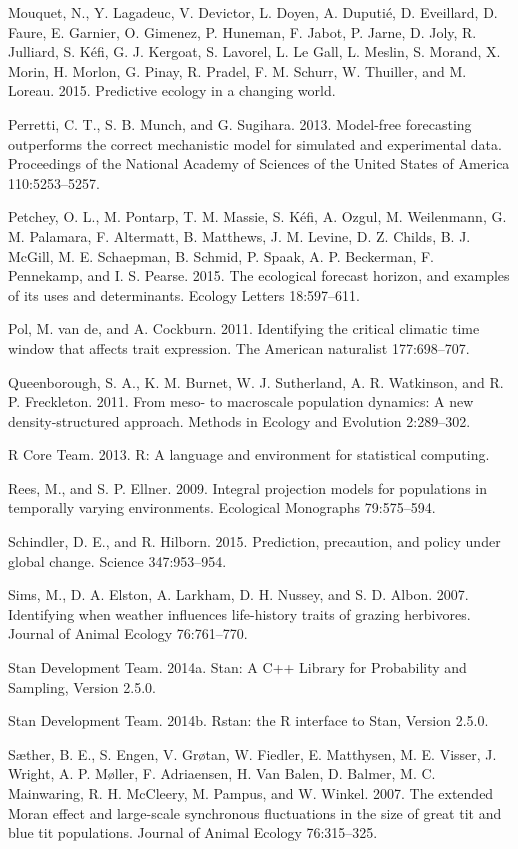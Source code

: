\documentclass[12pt,]{article}
\begin{document}
Mouquet, N., Y. Lagadeuc, V. Devictor, L. Doyen, A. Duputi{é}, D.
Eveillard, D. Faure, E. Garnier, O. Gimenez, P. Huneman, F. Jabot, P.
Jarne, D. Joly, R. Julliard, S. K{é}fi, G. J. Kergoat, S. Lavorel, L.
{Le Gall}, L. Meslin, S. Morand, X. Morin, H. Morlon, G. Pinay, R.
Pradel, F. M. Schurr, W. Thuiller, and M. Loreau. 2015. Predictive
ecology in a changing world.

Perretti, C. T., S. B. Munch, and G. Sugihara. 2013. Model-free
forecasting outperforms the correct mechanistic model for simulated and
experimental data. Proceedings of the National Academy of Sciences of
the United States of America 110:5253--5257.

Petchey, O. L., M. Pontarp, T. M. Massie, S. K{é}fi, A. Ozgul, M.
Weilenmann, G. M. Palamara, F. Altermatt, B. Matthews, J. M. Levine, D.
Z. Childs, B. J. McGill, M. E. Schaepman, B. Schmid, P. Spaak, A. P.
Beckerman, F. Pennekamp, and I. S. Pearse. 2015. The ecological forecast
horizon, and examples of its uses and determinants. Ecology Letters
18:597--611.

Pol, M. van de, and A. Cockburn. 2011. Identifying the critical climatic
time window that affects trait expression. The American naturalist
177:698--707.

Queenborough, S. A., K. M. Burnet, W. J. Sutherland, A. R. Watkinson,
and R. P. Freckleton. 2011. From meso- to macroscale population
dynamics: A new density-structured approach. Methods in Ecology and
Evolution 2:289--302.

R Core Team. 2013. R: A language and environment for statistical
computing.

Rees, M., and S. P. Ellner. 2009. Integral projection models for
populations in temporally varying environments. Ecological Monographs
79:575--594.

Schindler, D. E., and R. Hilborn. 2015. Prediction, precaution, and
policy under global change. Science 347:953--954.

Sims, M., D. A. Elston, A. Larkham, D. H. Nussey, and S. D. Albon. 2007.
Identifying when weather influences life-history traits of grazing
herbivores. Journal of Animal Ecology 76:761--770.

Stan Development Team. 2014a. Stan: A C++ Library for Probability and
Sampling, Version 2.5.0.

Stan Development Team. 2014b. Rstan: the R interface to Stan, Version
2.5.0.

S{æ}ther, B. E., S. Engen, V. Gr{ø}tan, W. Fiedler, E. Matthysen, M. E.
Visser, J. Wright, A. P. M{ø}ller, F. Adriaensen, H. {Van Balen}, D.
Balmer, M. C. Mainwaring, R. H. McCleery, M. Pampus, and W. Winkel.
2007. The extended Moran effect and large-scale synchronous fluctuations
in the size of great tit and blue tit populations. Journal of Animal
Ecology 76:315--325.
\end{document}
